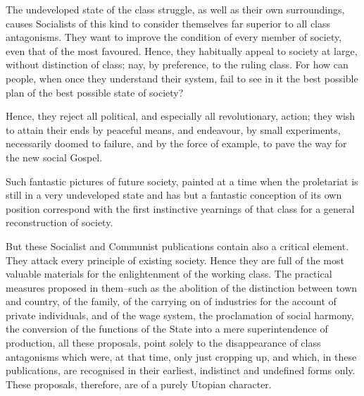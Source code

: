 \documentclass[11pt]{book}
\begin{document}
The undeveloped state of the class struggle, as well as their
own surroundings, causes Socialists of this kind to consider
themselves far superior to all class antagonisms.  They want to
improve the condition of every member of society, even that of
the most favoured.  Hence, they habitually appeal to society at
large, without  distinction of class; nay, by preference, to the
ruling class.  For how can people, when once they understand
their system, fail to see in it the best possible plan of the
best possible state of society?

Hence, they reject all political, and especially all
revolutionary, action; they wish to attain their ends by
peaceful means, and endeavour, by small experiments, necessarily
doomed to failure, and by the force of example, to pave the way
for the new social Gospel.

Such fantastic pictures of future society, painted at a time
when the proletariat is still in a very undeveloped state and has
but a fantastic conception of its own position correspond with
the first instinctive yearnings of that class for a general
reconstruction of society.

But these Socialist and Communist publications contain also a
critical element. They attack every principle of existing society.
Hence they are full of the most valuable materials for the
enlightenment of the working class. The practical measures
proposed in them--such as the abolition of the distinction
between town and country, of the family, of the carrying on of
industries for the account of private individuals, and of the wage
system, the proclamation of social harmony, the conversion of the
functions of the State into a mere superintendence of production,
all these proposals, point solely to the disappearance of class
antagonisms which were, at that time, only just cropping up, and
which, in these publications, are recognised in their earliest,
indistinct and undefined forms only. These proposals, therefore,
are of a purely Utopian character.
\end{document}
